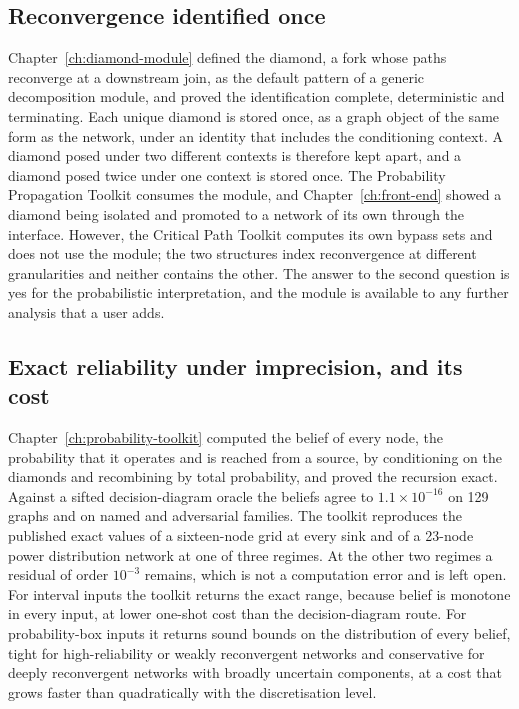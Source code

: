 \documentclass[12pt]{report}
\begin{document}
\subsection{Reconvergence identified once}

Chapter~\ref{ch:diamond-module} defined the diamond, a fork whose paths reconverge at a
downstream join, as the default pattern of a generic decomposition module, and proved the
identification complete, deterministic and terminating. Each unique diamond is stored once,
as a graph object of the same form as the network, under an identity that includes the
conditioning context. A diamond posed under two different contexts is therefore kept apart,
and a diamond posed twice under one context is stored once. The Probability Propagation
Toolkit consumes the module, and Chapter~\ref{ch:front-end} showed a diamond being isolated
and promoted to a network of its own through the interface. However, the Critical Path
Toolkit computes its own bypass sets and does not use the module; the two structures index
reconvergence at different granularities and neither contains the other. The answer to the
second question is yes for the probabilistic interpretation, and the module is available to
any further analysis that a user adds.

\subsection{Exact reliability under imprecision, and its cost}

Chapter~\ref{ch:probability-toolkit} computed the belief of every node, the probability that
it operates and is reached from a source, by conditioning on the diamonds and recombining by
total probability, and proved the recursion exact. Against a sifted decision-diagram oracle
the beliefs agree to $1.1 \times 10^{-16}$ on 129 graphs and on named and adversarial
families. The toolkit reproduces the published exact values of a sixteen-node grid at
every sink and of a 23-node power distribution network at one of three regimes. At the other
two regimes a residual of order $10^{-3}$ remains, which is not a computation error and is
left open. For interval inputs the toolkit returns the exact range, because belief is monotone in
every input, at lower one-shot cost than the decision-diagram route. For probability-box
inputs it returns sound bounds on the distribution of every belief, tight for
high-reliability or weakly reconvergent networks and conservative for deeply reconvergent
networks with broadly uncertain components, at a cost that grows faster than quadratically
with the discretisation level.
\end{document}
